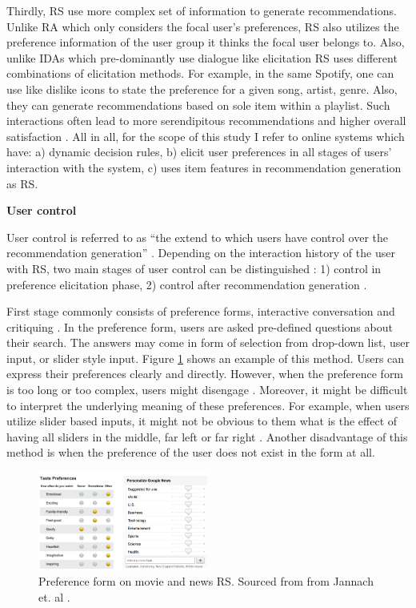 \documentclass[a4paper,12pt]{article}
\newcommand{\citeyearonly}[1]{\citeyearpar{#1}}
\begin{document}
Thirdly, RS use more complex set of information to generate recommendations. Unlike RA which only considers the focal user's preferences, RS also utilizes the preference information of the user group it thinks the focal user belongs to. Also, unlike IDAs which pre-dominantly use dialogue like elicitation RS uses different combinations of elicitation methods. For example, in the same Spotify, one can use like dislike icons to state the preference for a given song, artist, genre. Also, they can generate recommendations based on sole item within a playlist. Such interactions often lead to more serendipitous recommendations and higher overall satisfaction \citep{kotkovSurveySerendipityRecommender2016}. All in all, for the scope of this study I refer to online systems which have: a) dynamic decision rules, b) elicit user preferences in all stages of users' interaction with the system, c) uses item features in recommendation generation as RS.

\textbf{User control}

User control is referred to as ``the extend to which users have control over the recommendation generation'' \citep{knijnenburgExplainingUserExperience2012}. Depending on the interaction history of the user with RS, two main stages of user control can be distinguished : 1) control in preference elicitation phase, 2) control after recommendation generation \citep{jannach2017user}.

First stage commonly consists of preference forms, interactive conversation and critiquing \citep{jannach2019explanations}. In the preference form, users are asked pre-defined questions about their search. The answers may come in form of selection from drop-down list, user input, or slider style input. Figure \ref{fig:preference} shows an example of this method. Users can express their preferences clearly and directly.  However, when the preference form is too long or too complex, users might disengage \citep{jannach2017user}. Moreover, it might be difficult to interpret the underlying meaning of these preferences. For example, when users utilize slider based inputs, it might not be obvious to them what is the effect of having all sliders in the middle, far left or far right \citep{jannach2017user}. Another disadvantage of this method is when the preference of the user does not exist in the form at all.

\begin{figure}[H]
    \centering
    \includegraphics[width=0.5\textwidth]{staticFiles/preferenceForm.png}
    \caption[Preference form in RS]{Preference form on movie and news RS. Sourced from from Jannach et. al \citeyearonly{jannach2017user}.}
    \label{fig:preference}
\end{figure}
\end{document}
